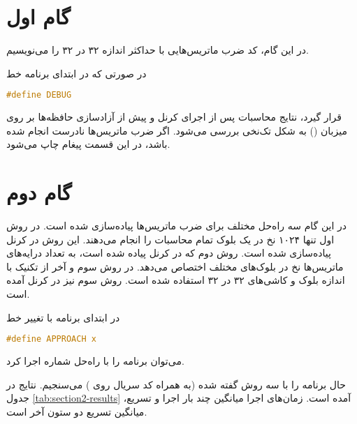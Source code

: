 \documentclass{HW}
\begin{document}
\pagestyle{pages}
\thispagestyle{first_page}

\section{گام اول}

در این گام، کد ضرب ماتریس‌هایی با حداکثر اندازه ۳۲ در ۳۲ را می‌نویسیم.

در صورتی که در ابتدای برنامه خط

\begin{latin}
\begin{lstlisting}[language=C, belowskip=-0.5\baselineskip]
#define DEBUG
\end{lstlisting}
\end{latin}

قرار گیرد، نتایج محاسبات پس از اجرای کرنل و پیش از آزادسازی حافظه‌ها بر روی میزبان () به شکل تک‌نخی بررسی می‌شود. اگر ضرب ماتریس‌ها نادرست انجام شده باشد، در این قسمت پیغام  چاپ می‌شود.


\section{گام دوم}

در این گام سه راه‌حل مختلف برای ضرب ماتریس‌ها پیاده‌سازی شده است. در روش اول تنها ۱۰۲۴ نخ در یک بلوک تمام محاسبات را انجام می‌دهند. این روش در کرنل  پیاده‌سازی شده است. روش دوم که در کرنل  پیاده شده است، به تعداد درایه‌های ماتریس‌ها نخ در بلوک‌های مختلف اختصاص می‌دهد. در روش سوم و آخر از تکنیک  با اندازه بلوک و کاشی‌های ۳۲ در ۳۲ استفاده شده است. روش سوم نیز در کرنل  آمده است.

در ابتدای برنامه با تغییر خط
\begin{latin}
\begin{lstlisting}[language=C, belowskip=-0.5\baselineskip]
#define APPROACH x
\end{lstlisting}
\end{latin}
می‌توان برنامه را با راه‌حل شماره  اجرا کرد.

حال برنامه را با سه روش گفته شده (به همراه کد سریال روی ) می‌سنجیم. نتایج در جدول
\ref{tab:section2-results}
آمده است. زمان‌های اجرا میانگین چند بار اجرا و تسریع، میانگین تسریع دو ستون آخر است.
\end{document}

